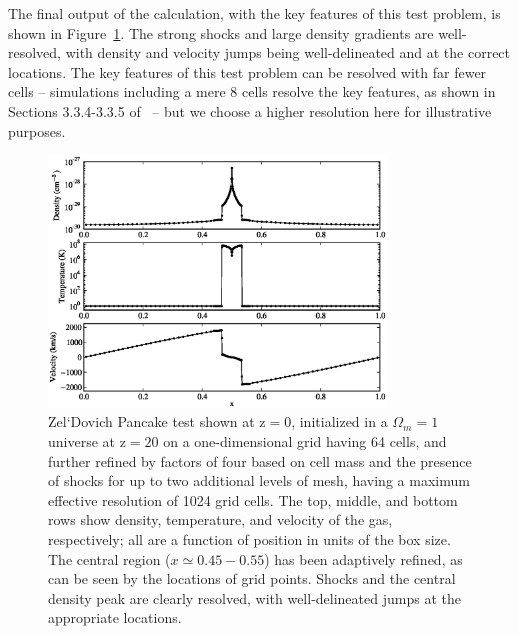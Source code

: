 The final output of the calculation, with the key features of this
test problem, is shown in Figure~\ref{fig.pancake}.
The strong shocks and large density gradients are well-resolved, with
density and velocity jumps being well-delineated and at the correct
locations.  The key features of 
this test problem can be resolved with far fewer cells -- simulations
including a mere 8 cells resolve the key features, as shown in
Sections 3.3.4-3.3.5 of~\citet{BryanThesis96} -- but we choose a
higher resolution here for illustrative purposes.

\begin{figure}
\begin{center}
\includegraphics[width=0.8\textwidth]{figures/AMRZeldovichPancake.eps}
\caption{Zel`Dovich Pancake test shown at z$ = 0$, initialized in a
$\Omega_m = 1$ universe at z$ = 20$ on a one-dimensional grid having
64 cells, and further refined by factors of four based on cell mass
and the presence of shocks for up to two additional levels of mesh,
having a maximum effective resolution of 1024 grid cells. The top,
middle, and bottom rows show density, temperature, and velocity of the
gas, respectively; all are a function of position in units of the box
size.  The central region ($x \simeq 0.45-0.55$) has been adaptively
refined, as can be seen by the locations of grid points.  Shocks and
the central density peak are clearly resolved, with well-delineated
jumps at the appropriate locations.}
\label{fig.pancake}
\end{center}
\end{figure}
